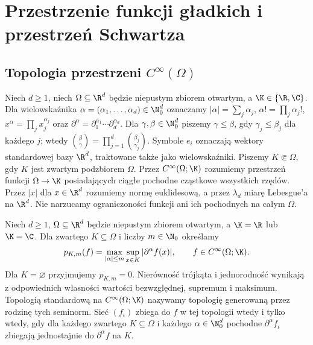 \setcounter{section}{16}
\section{Przestrzenie funkcji gładkich i przestrzeń Schwartza}
\label{sec:gladkie-schwartz17}

\providecommand{\atlasref}[2]{#2}


\subsection{Topologia przestrzeni \texorpdfstring{$C^\infty(\Omega)$}{Cinfty(Omega)}}

Niech $d\ge1$, niech $\Omega\subseteq\R^d$ będzie niepustym zbiorem
otwartym, a $\K\in\{\R,\C\}$. Dla wielowskaźnika
$\alpha=(\alpha_1,\dots,\alpha_d)\in\N_0^d$ oznaczamy
$|\alpha|=\sum_j\alpha_j$, $\alpha!=\prod_j\alpha_j!$,
$x^\alpha=\prod_jx_j^{\alpha_j}$ oraz
$\partial^\alpha=\partial_1^{\alpha_1}\cdots\partial_d^{\alpha_d}$.
Dla $\gamma,\beta\in\N_0^d$ piszemy $\gamma\le\beta$,
gdy $\gamma_j\le\beta_j$ dla każdego $j$;
wtedy $\binom{\beta}{\gamma}=\prod_{j=1}^d\binom{\beta_j}{\gamma_j}$.
Symbole $e_i$ oznaczają wektory standardowej bazy $\R^d$,
traktowane także jako wielowskaźniki. Piszemy $K\Subset\Omega$,
gdy $K$ jest zwartym podzbiorem $\Omega$.
Przez $C^\infty(\Omega;\K)$ rozumiemy przestrzeń funkcji
$\Omega\to\K$ posiadających ciągłe pochodne cząstkowe wszystkich rzędów.
Przez $|x|$ dla $x\in\R^d$ rozumiemy normę euklidesową,
a przez $\lambda_d$ miarę Lebesgue'a na $\R^d$.
Nie narzucamy ograniczoności funkcji ani ich pochodnych na całym $\Omega$.

\begin{definicja}
\label{def:seminormy-cinf17}
Niech $d\ge1$, $\Omega\subseteq\R^d$ będzie niepustym zbiorem
otwartym, a $\K=\R$ lub $\K=\C$.
Dla zwartego $K\subseteq\Omega$ i liczby $m\in\N_0$ określamy
\[
 p_{K,m}(f)=\max_{|\alpha|\le m}\sup_{x\in K}|\partial^\alpha f(x)|,
 \qquad f\in C^\infty(\Omega;\K).
\]
Dla $K=\varnothing$ przyjmujemy $p_{K,m}=0$.
Nierówność trójkąta i jednorodność wynikają z odpowiednich
własności wartości bezwzględnej, supremum i maksimum.
Topologią standardową na $C^\infty(\Omega;\K)$ nazywamy
topologię generowaną przez rodzinę tych seminorm.
Sieć $(f_\iota)$ zbiega do $f$ w tej topologii wtedy i tylko wtedy,
gdy dla każdego zwartego $K\subseteq\Omega$ i każdego
$\alpha\in\N_0^d$ pochodne $\partial^\alpha f_\iota$
zbiegają jednostajnie do $\partial^\alpha f$ na $K$.
\end{definicja}

